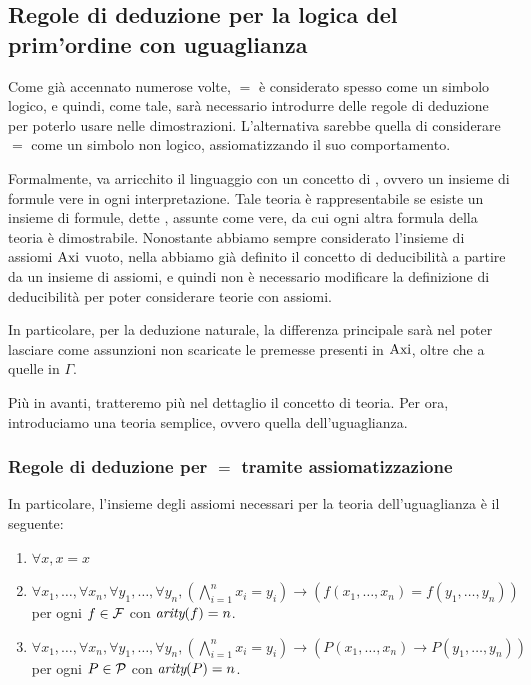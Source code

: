 \subsection{Regole di deduzione per la logica del prim'ordine con uguaglianza}

Come già accennato numerose volte, \(=\) è considerato spesso come un simbolo logico, e quindi, come tale, sarà necessario introdurre delle regole di deduzione per poterlo usare nelle dimostrazioni. L'alternativa sarebbe quella di considerare \(=\) come un simbolo non logico, assiomatizzando il suo comportamento.

Formalmente, va arricchito il linguaggio con un concetto di , ovvero un insieme di formule vere in ogni interpretazione. Tale teoria è rappresentabile se esiste un insieme di formule, dette , assunte come vere, da cui ogni altra formula della teoria è dimostrabile. Nonostante abbiamo sempre considerato l'insieme di assiomi \(\operatorname{Axi}\) vuoto, nella  abbiamo già definito il concetto di deducibilità a partire da un insieme di assiomi, e quindi non è necessario modificare la definizione di deducibilità per poter considerare teorie con assiomi.

In particolare, per la deduzione naturale, la differenza principale sarà nel poter lasciare come assunzioni non scaricate le premesse presenti in \(\operatorname{Axi}\), oltre che a quelle in \(\Gamma\).

Più in avanti, tratteremo più nel dettaglio il concetto di teoria. Per ora, introduciamo una teoria semplice, ovvero quella dell'uguaglianza.

\subsubsection{Regole di deduzione per \(=\) tramite assiomatizzazione}

In particolare, l'insieme degli assiomi necessari per la teoria dell'uguaglianza è il seguente:

\begin{enumerate}
  \item \(\forall x, x=x\)
  \item \(\forall x_1,\ldots, \forall x_n, \forall y_1, \ldots, \forall y_n, (\bigwedge_{i=1}^n x_i = y_i) \to (f(x_1, \ldots, x_n) = f(y_1, \ldots, y_n))\) per ogni \(f \in \mathcal{F}\) con \(\operatorname{\textit{arity}}(f) = n\).
  \item \(\forall x_1,\ldots, \forall x_n, \forall y_1, \ldots, \forall y_n, (\bigwedge_{i=1}^n x_i = y_i) \to (P(x_1, \ldots, x_n) \to P(y_1, \ldots, y_n))\) per ogni \(P \in \mathcal{P}\) con \(\operatorname{\textit{arity}}(P) = n\).
\end{enumerate}

